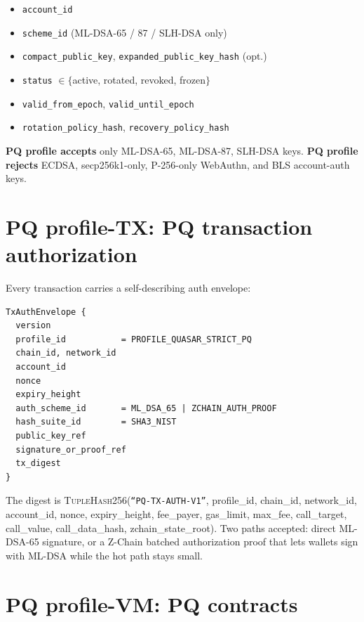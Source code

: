 \documentclass[11pt,a4paper]{article}
\begin{document}
\begin{itemize}[leftmargin=*, itemsep=0pt]
\item \texttt{account\_id}
\item \texttt{scheme\_id} (ML-DSA-65 / 87 / SLH-DSA only)
\item \texttt{compact\_public\_key}, \texttt{expanded\_public\_key\_hash} (opt.)
\item \texttt{status} $\in \{$active, rotated, revoked, frozen$\}$
\item \texttt{valid\_from\_epoch}, \texttt{valid\_until\_epoch}
\item \texttt{rotation\_policy\_hash}, \texttt{recovery\_policy\_hash}
\end{itemize}

\textbf{PQ profile accepts} only ML-DSA-65, ML-DSA-87, SLH-DSA keys.
\textbf{PQ profile rejects} ECDSA, secp256k1-only, P-256-only WebAuthn,
and BLS account-auth keys.

\section{PQ profile-TX: PQ transaction authorization}
\label{sec:pq-tx}

Every transaction carries a self-describing auth envelope:

\begin{verbatim}
TxAuthEnvelope {
  version
  profile_id           = PROFILE_QUASAR_STRICT_PQ
  chain_id, network_id
  account_id
  nonce
  expiry_height
  auth_scheme_id       = ML_DSA_65 | ZCHAIN_AUTH_PROOF
  hash_suite_id        = SHA3_NIST
  public_key_ref
  signature_or_proof_ref
  tx_digest
}
\end{verbatim}

\noindent
The digest is \textsc{TupleHash256}(\texttt{``PQ-TX-AUTH-V1''},
profile\_id, chain\_id, network\_id, account\_id, nonce,
expiry\_height, fee\_payer, gas\_limit, max\_fee, call\_target,
call\_value, call\_data\_hash, zchain\_state\_root). Two paths
accepted: direct ML-DSA-65 signature, or a Z-Chain batched
authorization proof that lets wallets sign with ML-DSA while the
hot path stays small.

\section{PQ profile-VM: PQ contracts}
\label{sec:pq-vm}
\end{document}
